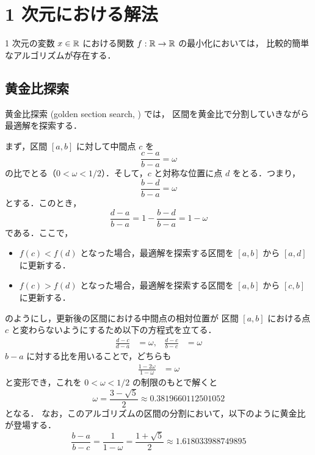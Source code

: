 %

\section{1 次元における解法}

1 次元の変数 $x \in \mathbb{R}$ における関数 $f : \mathbb{R} \to \mathbb{R}$ の最小化においては，
比較的簡単なアルゴリズムが存在する．

\subsection{黄金比探索}

黄金比探索 (golden section search, \cite[10.2]{Press2007}) では，
区間を黄金比で分割していきながら最適解を探索する．

まず，区間 $[a,b]$ に対して中間点 $c$ を
\begin{equation}
    \frac{c - a}{b - a} = \omega
\end{equation}
の比でとる（$0 < \omega < 1/2$）．そして，$c$ と対称な位置に点 $d$ をとる．つまり，
\begin{equation}
    \frac{b - d}{b - a} = \omega
\end{equation}
とする．このとき，
\begin{equation}
    \frac{d - a}{b - a} = 1 - \frac{b - d}{b - a} = 1 - \omega
\end{equation}
である．ここで，
\begin{itemize}
    \item $f(c) < f(d)$ となった場合，最適解を探索する区間を $[a, b]$ から $[a, d]$ に更新する．
    \item $f(c) > f(d)$ となった場合，最適解を探索する区間を $[a, b]$ から $[c, b]$ に更新する．
\end{itemize}
のようにし，更新後の区間における中間点の相対位置が
区間 $[a, b]$ における点 $c$ と変わらないようにするため以下の方程式を立てる．
\begin{align}
    \frac{d - c}{d - a} &= \omega, &
    \frac{d - c}{b - c} &= \omega
\end{align}
$b - a$ に対する比を用いることで，どちらも
\begin{align}
    \frac{1 - 2\omega}{1 - \omega} &= \omega
\end{align}
と変形でき，これを $0 < \omega < 1/2$ の制限のもとで解くと
\begin{equation}
    \omega = \frac{3 - \sqrt{5}}{2} \approx 0.3819660112501052
\end{equation}
となる．
なお，このアルゴリズムの区間の分割において，以下のように黄金比が登場する．
\begin{equation}
    \frac{b - a}{b - c} = \frac{1}{1 - \omega} = \frac{1 + \sqrt{5}}{2} \approx 1.618033988749895
\end{equation}
